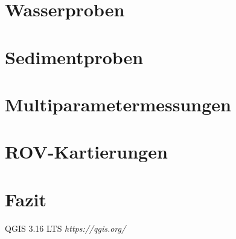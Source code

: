 \documentclass[12pt,titlepage]{scrreprt}
\begin{document}
\section{Wasserproben}
\section{Sedimentproben}
\section{Multiparametermessungen}
\section{ROV-Kartierungen}
\section{Fazit}

\begin{thebibliography}{9}
QGIS 3.16 LTS
\textit{https://qgis.org/}
\end{thebibliography}




{}

\end{document}

